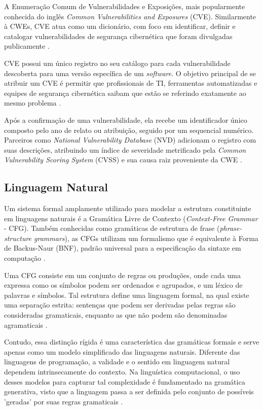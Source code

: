 \documentclass[
    12pt,                %
    openright,           %
    oneside,             %
    a4paper,             %
    english,             %
    brazil               %
]{abntex2}
\begin{document}
\begin{itemize}
\par
A Enumeração Comum de Vulnerabilidades e Exposições, mais popularmente conhecida do inglês \textit{Common Vulnerabilities and Exposures} (CVE).
Similarmente à CWEs, CVE atua como um dicionário, com foco em identificar, definir e catalogar vulnerabilidades de segurança cibernética que foram divulgadas publicamente \cite{cveabout}.
\par 
CVE possui um único registro no seu catálogo para cada vulnerabilidade descoberta para uma versão específica de um \textit{software}.
O objetivo principal de se atribuir um CVE é permitir que profissionais de TI, ferramentas automatizadas e equipes de segurança cibernética saibam que estão se referindo exatamente ao mesmo problema \cite{cveabout}.
\par
Após a confirmação de uma vulnerabilidade, ela recebe um identificador único composto pelo ano de relato ou atribuição, seguido por um sequencial numérico.
Parceiros como \textit{National Vulnerability Database} (NVD) adicionam o registro com suas descrições, atribuindo um índice de severidade metrificado pela \textit{Common Vulnerability Scoring System} (CVSS) e sua causa raiz proveniente da CWE \cite{cveabout}.

\subsection{Linguagem Natural}
\label{subsec:linguagemnatural}
\par
Um sistema formal amplamente utilizado para modelar a estrutura constituinte em linguagens naturais é a Gramática Livre de Contexto (\textit{Context-Free Grammar} - CFG). 
Também conhecidas como gramáticas de estrutura de frase (\textit{phrase-structure grammars}), as CFGs utilizam um formalismo que é equivalente à Forma de Backus-Naur (BNF), padrão universal para a especificação da sintaxe em computação \cite{jurafsky2026speech}.
\par
Uma CFG consiste em um conjunto de regras ou produções, onde cada uma expressa como os símbolos podem ser ordenados e agrupados, e um léxico de palavras e símbolos.
Tal estrutura define uma linguagem formal, na qual existe uma separação estrita: sentenças que podem ser derivadas pelas regras são consideradas gramaticais, enquanto as que não podem são denominadas agramaticais \cite{jurafsky2026speech}.
\par
Contudo, essa distinção rígida é uma característica das gramáticas formais e serve apenas como um modelo simplificado das linguagens naturais.
Diferente das linguagens de programação, a validade e o sentido em linguagem natural dependem intrinsecamente do contexto.
Na linguística computacional, o uso desses modelos para capturar tal complexidade é fundamentado na gramática generativa, visto que a linguagem passa a ser definida pelo conjunto de possíveis 'geradas' por suas regras gramaticais \cite{jurafsky2026speech}.


\end{itemize}
\end{document}
